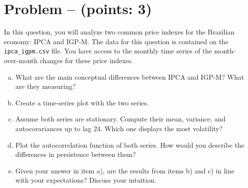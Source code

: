 \documentclass[11pt]{article}
\theoremstyle{definition}
\newcounter{problem}
\renewcommand{\theproblem}{\arabic{problem}}
\newcommand{\problem}[1]{
	\stepcounter{problem}
	\section*{Problem \theproblem{} -- (points: #1)}
}
\begin{document}
\problem{3}
In this question, you will analyze two common price indexes for the Brazilian economy: IPCA and IGP-M. The data for this question is contained on the \texttt{ipca\_igpm.csv} file. You have access to the monthly time series of the month-over-month changes for these price indexes.

\begin{enumerate}[a)]
	\item What are the main conceptual differences between IPCA and IGP-M? What are they measuring?
	\item Create a time-series plot with the two series.
	\item Assume both series are stationary. Compute their mean, variance, and autocovariances up to lag 24. Which one displays the most volatility?
	\item Plot the autocorrelation function of both series. How would you describe the differences in persistence between them?
	\item Given your answer in item a), are the results from items b) and c) in line with your expectations? Discuss your intuition.
\end{enumerate}
\end{document}
